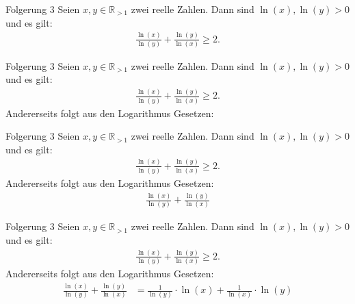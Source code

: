 \documentclass[10pt]{beamer}
\def\bR{\mathbb{R}}
\begin{document}
\begin{frame}{Folgerung 3}
    Seien \( x, y \in \bR_{> 1} \) zwei reelle Zahlen. Dann sind \( \ln\left( x \right), \ln\left( y \right) > 0 \) und es gilt:
    \begin{align*}
        \frac{\ln\left( x \right)}{\ln\left( y \right)} + \frac{\ln\left( y \right)}{\ln\left( x \right)} 
        \geq 2.
    \end{align*}
\end{frame}



\begin{frame}{Folgerung 3}
    Seien \( x, y \in \bR_{> 1} \) zwei reelle Zahlen. Dann sind \( \ln\left( x \right), \ln\left( y \right) > 0 \) und es gilt:
    \begin{align*}
        \frac{\ln\left( x \right)}{\ln\left( y \right)} + \frac{\ln\left( y \right)}{\ln\left( x \right)} 
        \geq 2.
    \end{align*}
    Andererseits folgt aus den Logarithmus Gesetzen:
\end{frame}



\begin{frame}{Folgerung 3}
    Seien \( x, y \in \bR_{> 1} \) zwei reelle Zahlen. Dann sind \( \ln\left( x \right), \ln\left( y \right) > 0 \) und es gilt:
    \begin{align*}
        \frac{\ln\left( x \right)}{\ln\left( y \right)} + \frac{\ln\left( y \right)}{\ln\left( x \right)} 
        \geq 2.
    \end{align*}
    Andererseits folgt aus den Logarithmus Gesetzen:
    \begin{align*}
        \frac{\ln\left( x \right)}{\ln\left( y \right)} + \frac{\ln\left( y \right)}{\ln\left( x \right)} 
    \end{align*}
\end{frame}



\begin{frame}{Folgerung 3}
    Seien \( x, y \in \bR_{> 1} \) zwei reelle Zahlen. Dann sind \( \ln\left( x \right), \ln\left( y \right) > 0 \) und es gilt:
    \begin{align*}
        \frac{\ln\left( x \right)}{\ln\left( y \right)} + \frac{\ln\left( y \right)}{\ln\left( x \right)} 
        \geq 2.
    \end{align*}
    Andererseits folgt aus den Logarithmus Gesetzen:
    \begin{align*}
        \frac{\ln\left( x \right)}{\ln\left( y \right)} + \frac{\ln\left( y \right)}{\ln\left( x \right)} 
        & = \frac{1}{\ln\left( y \right)} \cdot \ln\left( x \right) + \frac{1}{\ln\left( x \right)} \cdot \ln\left( y \right)
    \end{align*}
\end{frame}
\end{document}
